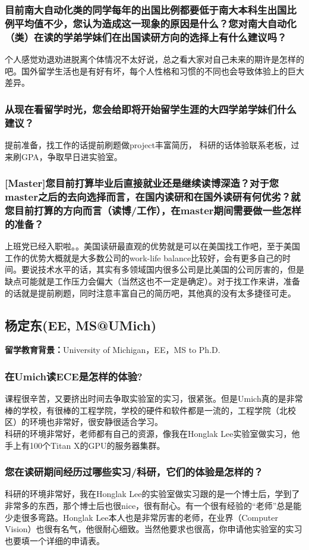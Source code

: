\documentclass[a4paper,UTF8]{book}
\begin{document}
    \subsubsection*{目前南大自动化类的同学每年的出国比例都要低于南大本科生出国比例平均值不少，您认为造成这一现象的原因是什么？您对南大自动化（类）在读的学弟学妹们在出国读研方向的选择上有什么建议吗？}
    个人感觉劝退劝进脱离个体情况不太好说，总之看大家对自己未来的期许是怎样的吧。国外留学生活也是有好有坏，每个人性格和习惯的不同也会导致体验上的巨大差异。

    \subsubsection*{从现在看留学时光，您会给即将开始留学生涯的大四学弟学妹们什么建议？}
    提前准备，找工作的话提前刷题做project丰富简历， 科研的话体验联系老板，过来刷GPA，争取早日进实验室。

    \subsubsection*{[Master]您目前打算毕业后直接就业还是继续读博深造？对于您master之后的去向选择而言，在国内读研和在国外读研有何优劣？就您目前打算的方向而言（读博/工作），在master期间需要做一些怎样的准备？}
    上班党已经入职啦。。美国读研最直观的优势就是可以在美国找工作吧，至于美国工作的优势大概就是大多数公司的work-life balance比较好，会有更多自己的时间。要说技术水平的话，其实有多领域国内很多公司是比美国的公司厉害的，但是缺点可能就是工作压力会偏大（当然这也不一定是确定）。对于找工作来讲，准备的话就是提前刷题，同时注意丰富自己的简历吧，其他真的没有太多捷径可走。


\clearpage
\subsection{杨定东(EE, MS@UMich)}
    \textbf{留学教育背景：}University of Michigan，EE，MS to Ph.D.

    \subsubsection*{在Umich读ECE是怎样的体验?}
    课程很辛苦，又要挤出时间去争取实验室的实习，很紧张。但是Umich真的是非常棒的学校，有很棒的工程学院，学校的硬件和软件都是一流的，工程学院（北校区）的环境也非常好，很安静很适合学习。\\
    科研的环境非常好，老师都有自己的资源，像我在Honglak Lee实验室做实习，他手上有100个Titan X的GPU的服务器集群。
    \subsubsection*{您在读研期间经历过哪些实习/科研，它们的体验是怎样的？}
    科研的环境非常好，我在Honglak Lee的实验室做实习跟的是一个博士后，学到了非常多的东西，那个博士后也很nice，很有耐心。有一个很有经验的“老师”总是能少走很多弯路。Honglak Lee本人也是非常厉害的老师，在业界（Computer Vision）也很有名气，他很耐心细致。当然他要求也很高，你申请他实验室的实习也要填一个详细的申请表。
\end{document}
